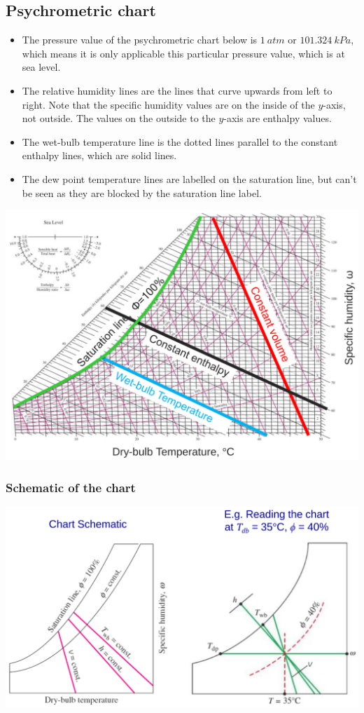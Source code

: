 \documentclass[11pt]{article}
\begin{document}
\subsection{Psychrometric chart}
\label{sec:orgfed41a8}
\begin{itemize}
\item The pressure value of the psychrometric chart below is \(\qty{1}{atm}\) or \(\qty{101.324}{kPa}\), which means it is only applicable this particular pressure value, which is at sea level.
\item The relative humidity lines are the lines that curve upwards from left to right. Note that the specific humidity values are on the inside of the \(y\)-axis, not outside. The values on the outside to the \(y\)-axis are enthalpy values.
\item The wet-bulb temperature line is the dotted lines parallel to the constant enthalpy lines, which are solid lines.
\item The dew point temperature lines are labelled on the saturation line, but can't be seen as they are blocked by the saturation line label.
\end{itemize}
\begin{center}
\includegraphics[width=.9\linewidth]{./images/psychrometric-chart.png}
\end{center}

\subsubsection{Schematic of the chart}
\label{sec:org5cdcf9a}
\begin{center}
\includegraphics[width=.9\linewidth]{./images/psychrometric-chart-schematic.png}
\end{center}
\end{document}
